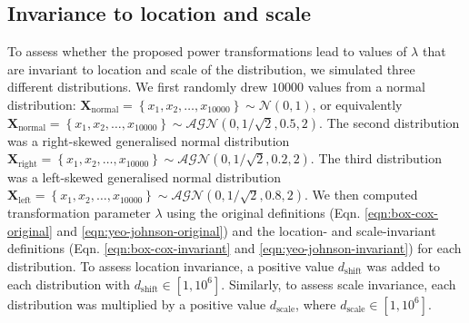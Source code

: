 \documentclass[preprint,12pt,authoryear]{elsarticle}
\begin{document}
\subsection{Invariance to location and
scale}\label{invariance-to-location-and-scale}

To assess whether the proposed power transformations lead to values of
\(\lambda\) that are invariant to location and scale of the
distribution, we simulated three different distributions. We first
randomly drew \(10000\) values from a normal distribution:
\(\mathbf{X}_{\text{normal}} = \left\{x_1, x_2, \ldots, x_{10000} \right\} \sim \mathcal{N}\left(0, 1\right)\),
or equivalently
\(\mathbf{X}_{\text{normal}} = \left\{x_1, x_2, \ldots, x_{10000} \right\} \sim \mathcal{AGN}\left(0, 1/\sqrt{2}, 0.5, 2\right)\).
The second distribution was a right-skewed generalised normal
distribution
\(\mathbf{X}_{\text{right}} = \left\{x_1, x_2, \ldots, x_{10000} \right\} \sim \mathcal{AGN}\left(0, 1/\sqrt{2}, 0.2, 2\right)\).
The third distribution was a left-skewed generalised normal distribution
\(\mathbf{X}_{\text{left}} = \left\{x_1, x_2, \ldots, x_{10000} \right\} \sim \mathcal{AGN}\left(0, 1/\sqrt{2}, 0.8, 2\right)\).
We then computed transformation parameter \(\lambda\) using the original
definitions (Eqn. \ref{eqn:box-cox-original} and
\ref{eqn:yeo-johnson-original}) and the location- and scale-invariant
definitions (Eqn. \ref{eqn:box-cox-invariant} and
\ref{eqn:yeo-johnson-invariant}) for each distribution. To assess
location invariance, a positive value \(d_{\text{shift}}\) was added to
each distribution with \(d_{\text{shift}} \in [1, 10^6]\). Similarly, to
assess scale invariance, each distribution was multiplied by a positive
value \(d_{\text{scale}}\), where \(d_{\text{scale}} \in [1, 10^6]\).
\end{document}
